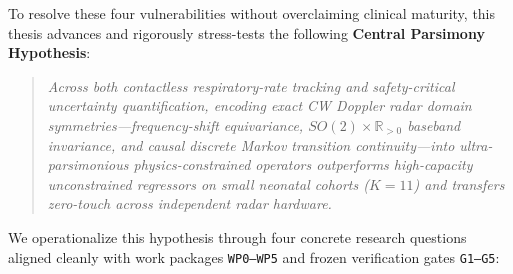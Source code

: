 To resolve these four vulnerabilities without overclaiming clinical maturity, this thesis advances
and rigorously stress-tests the following \textbf{Central Parsimony Hypothesis}:
\begin{quote}
\itshape
Across both contactless respiratory-rate tracking and safety-critical uncertainty quantification,
encoding exact CW Doppler radar domain symmetries---frequency-shift equivariance,
$SO(2)\times\mathbb{R}_{>0}$ baseband invariance, and causal discrete Markov transition
continuity---into ultra-parsimonious physics-constrained operators outperforms high-capacity
unconstrained regressors on small neonatal cohorts ($K=11$) and transfers zero-touch across
independent radar hardware.
\end{quote}

We operationalize this hypothesis through four concrete research questions aligned cleanly with
work packages \texttt{WP0--WP5} and frozen verification gates \texttt{G1--G5}:


